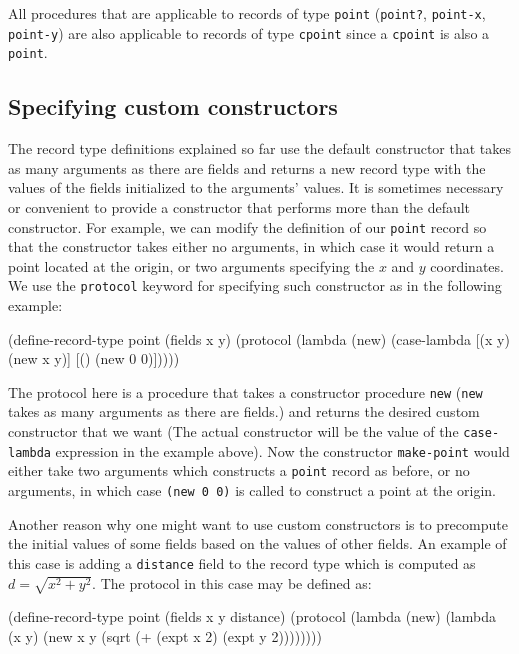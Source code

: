 \documentclass[onecolumn, 12pt, twoside, openright, dvipdfm]{book}
\begin{document}
All procedures that are applicable to records of type
\texttt{point} (\texttt{point?}, \texttt{point-x},
\texttt{point-y}) are also applicable to records of type
\texttt{cpoint} since a \texttt{cpoint} is also a \texttt{point}.

\subsection{Specifying custom constructors}

The record type definitions explained so far use the default
constructor that takes as many arguments as there are fields and
returns a new record type with the values of the fields initialized
to the arguments' values.  It is sometimes necessary or convenient
to provide a constructor that performs more than the default
constructor.  For example, we can modify the definition of our
\texttt{point} record so that the constructor takes either
no arguments, in which case it would return a point located at the
origin, or two arguments specifying the $x$ and $y$ coordinates.  We
use the \texttt{protocol} keyword for specifying such constructor as
in the following example:

\begin{CodeInline}
(define-record-type point
  (fields x y)
  (protocol
    (lambda (new)
      (case-lambda
        [(x y) (new x y)]
        [()    (new 0 0)]))))
\end{CodeInline}

The protocol here is a procedure that takes a constructor procedure
\texttt{new} (\texttt{new} takes as many arguments as there are
fields.) and returns the desired custom constructor that we want
(The actual constructor will be the value of the
\texttt{case-lambda} expression in the example above).
Now the constructor \texttt{make-point} would either take two
arguments which constructs a \texttt{point} record as before, or no
arguments, in which case \texttt{(new 0 0)} is called to construct a
point at the origin. 

Another reason why one might want to use custom constructors is to
precompute the initial values of some fields based on the values of
other fields.  An example of this case is adding a \texttt{distance}
field to the record type which is computed as
$d = \sqrt{x^2+y^2}$.  The protocol in this case may be defined as:

\begin{CodeInline}
(define-record-type point
  (fields x y distance)
  (protocol
    (lambda (new)
      (lambda (x y)
        (new x y (sqrt (+ (expt x 2) (expt y 2))))))))
\end{CodeInline}
\end{document}
